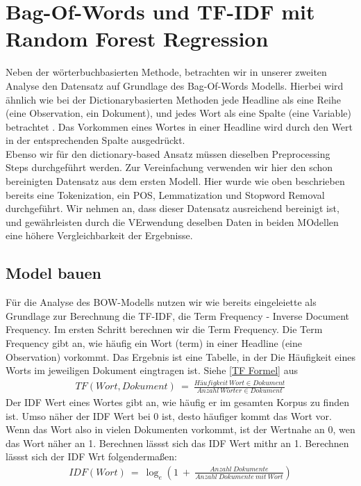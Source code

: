 \section{Bag-Of-Words und TF-IDF mit Random Forest Regression}
Neben der wörterbuchbasierten Methode, betrachten wir in unserer zweiten Analyse den Datensatz auf Grundlage des Bag-Of-Words Modells. Hierbei wird ähnlich wie bei der Dictionarybasierten Methoden jede Headline als eine Reihe (eine Observation, ein Dokument), und jedes Wort als eine Spalte (eine Variable) betrachtet \citep{das2018improved}. Das Vorkommen eines Wortes in einer Headline wird durch den Wert in der entsprechenden Spalte ausgedrückt.\\
Ebenso wir für den dictionary-based Ansatz müssen dieselben Preprocessing Steps durchgeführt werden. Zur Vereinfachung verwenden wir hier den schon bereinigten Datensatz aus dem ersten Modell. Hier wurde wie oben beschrieben bereits eine Tokenization, ein POS, Lemmatization und Stopword Removal durchgeführt. Wir nehmen an, dass dieser Datensatz ausreichend bereinigt ist, und gewährleisten durch die VErwendung deselben Daten in beiden MOdellen eine höhere Vergleichbarkeit der Ergebnisse.
\subsection{Model bauen}
Für die Analyse des BOW-Modells nutzen wir wie bereits eingeleiette als Grundlage zur Berechnung die TF-IDF, die Term Frequency - Inverse Document Frequency. Im ersten Schritt berechnen wir die Term Frequency. Die Term Frequency gibt an, wie häufig ein Wort (term) in einer Headline (eine Observation) vorkommt. Das Ergebnis ist eine Tabelle, in der Die Häufigkeit eines Worts im jeweiligen Dokument eingtragen ist. Siehe \ref{TF Formel} aus \citep{das2018improved}
\begin{align}
    TF(Wort, Dokument)\: { = }\: \frac{Häufigkeit \: Wort \in Dokument}{Anzahl\: Wörter \in Dokument}
    \label{TF Formel}
\end{align}
Der IDF Wert eines Wortes gibt an, wie häufig er im gesamten Korpus zu finden ist. Umso näher der IDF Wert bei 0 ist, desto häufiger kommt das Wort vor. Wenn das Wort also in vielen Dokumenten vorkommt, ist der Wertnahe an 0, wen  das Wort näher an 1. Berechnen lässst sich das IDF Wert mithr an 1. Berechnen lässst sich der IDF Wrt folgendermaßen:
\begin{align}
    IDF(Wort)\: { = }\:\log_{e}(1 \: {+}\: \frac{Anzahl\:Dokumente }{Anzahl \:Dokumente \:mit\: Wort})
\end{align}

